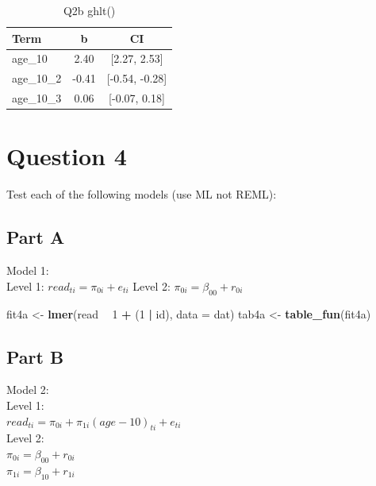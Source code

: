 \documentclass[]{article}
\newenvironment{Shaded}{\begin{snugshade}}{\end{snugshade}}
\newcommand{\KeywordTok}[1]{\textcolor[rgb]{0.13,0.29,0.53}{\textbf{#1}}}
\newcommand{\DataTypeTok}[1]{\textcolor[rgb]{0.13,0.29,0.53}{#1}}
\newcommand{\DecValTok}[1]{\textcolor[rgb]{0.00,0.00,0.81}{#1}}
\newcommand{\StringTok}[1]{\textcolor[rgb]{0.31,0.60,0.02}{#1}}
\newcommand{\OperatorTok}[1]{\textcolor[rgb]{0.81,0.36,0.00}{\textbf{#1}}}
\newcommand{\NormalTok}[1]{#1}
\begin{document}
\begin{table}

\caption{\label{tab:unnamed-chunk-4}Q2b ghlt()}
\centering
\begin{tabular}[t]{lcc}
\toprule
Term & b & CI\\
\midrule
age\_10 & 2.40 & [2.27, 2.53]\\
age\_10\_2 & -0.41 & [-0.54, -0.28]\\
age\_10\_3 & 0.06 & [-0.07, 0.18]\\
\bottomrule
\end{tabular}
\end{table}

\section{Question 4}\label{question-4}

Test each of the following models (use ML not REML):

\subsection{Part A}\label{part-a-1}

Model 1:\\
Level 1: \(read_{ti} = \pi_{0i} + e_{ti}\) Level 2:
\(\pi_{0i} = \beta_{00} + r_{0i}\)

\begin{Shaded}
\begin{Highlighting}[]
\NormalTok{fit4a <-}\StringTok{ }\KeywordTok{lmer}\NormalTok{(read }\OperatorTok{~}\StringTok{ }\DecValTok{1} \OperatorTok{+}\StringTok{ }\NormalTok{(}\DecValTok{1} \OperatorTok{|}\StringTok{ }\NormalTok{id), }\DataTypeTok{data =}\NormalTok{ dat)}
\NormalTok{tab4a <-}\StringTok{ }\KeywordTok{table_fun}\NormalTok{(fit4a)}
\end{Highlighting}
\end{Shaded}

\subsection{Part B}\label{part-b-1}

Model 2:\\
Level 1:\\
\(read_{ti} = \pi_{0i} + \pi_{1i}(age-10)_{ti} + e_{ti}\)\\
Level 2:\\
\(\pi_{0i} = \beta_{00} + r_{0i}\)\\
\(\pi_{1i} = \beta_{10} + r_{1i}\)
\end{document}
